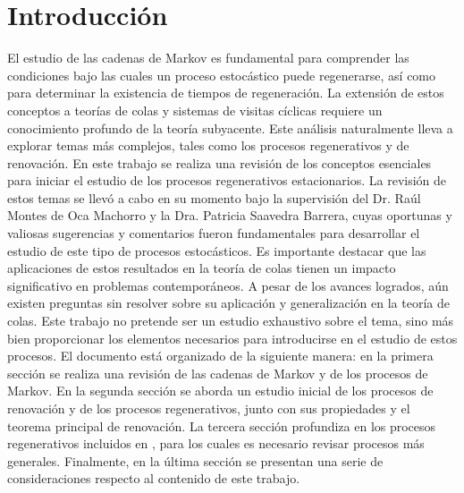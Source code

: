 \documentclass{article}
\numberwithin{equation}{section}
\begin{document}
\tableofcontents

\section*{Introducción}
El estudio de las cadenas de Markov es fundamental para comprender las condiciones bajo las cuales un proceso estocástico puede regenerarse, así como para determinar la existencia de tiempos de regeneración. La extensión de estos conceptos a teorías de colas y sistemas de visitas cíclicas requiere un conocimiento profundo de la teoría subyacente. Este análisis naturalmente lleva a explorar temas más complejos, tales como los procesos regenerativos y de renovación. En este trabajo se realiza una revisión de los conceptos esenciales para iniciar el estudio de los procesos regenerativos estacionarios. La revisión de estos temas se llevó a cabo en su momento bajo la supervisión del Dr. Raúl Montes de Oca Machorro y la Dra. Patricia Saavedra Barrera, cuyas oportunas y valiosas sugerencias y comentarios fueron fundamentales para desarrollar el estudio de este tipo de procesos estocásticos. Es importante destacar que las aplicaciones de estos resultados en la teoría de colas tienen un impacto significativo en problemas contemporáneos. A pesar de los avances logrados, aún existen preguntas sin resolver sobre su aplicación y generalización en la teoría de colas. Este trabajo no pretende ser un estudio exhaustivo sobre el tema, sino más bien proporcionar los elementos necesarios para introducirse en el estudio de estos procesos. El documento está organizado de la siguiente manera: en la primera sección se realiza una revisión de las cadenas de Markov y de los procesos de Markov. En la segunda sección se aborda un estudio inicial de los procesos de renovación y de los procesos regenerativos, junto con sus propiedades y el teorema principal de renovación. La tercera sección profundiza en los procesos regenerativos incluidos en \cite{Thorisson}, para los cuales es necesario revisar procesos más generales. Finalmente, en la última sección se presentan una serie de consideraciones respecto al contenido de este trabajo.
\end{document}

